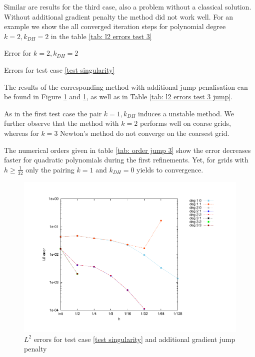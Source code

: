 Similar are results for the third case, also a problem without a classical solution. Without additional gradient penalty the method did not work well. For an example we show the all converged iteration steps for polynomial degree $k=2, k_{DH}=2$ in the table \ref{tab: l2 errors test 3}
\begin{table}[H]
		\centering
		\pgfplotstabletypeset[
		columns={iterations, l2error, h1error,N},
		    every row 0 column 0/.style={set content=init},
		]{\MAThreedegTwoTwo}
    	\caption{Error for $k=2, k_{DH}=2$}
	\caption{Errors for test case \ref{test singularity}}
	\label{tab: l2 errors test 3}
\end{table}

The results of the corresponding method with additional jump penalisation can be found in Figure \ref{fig: l2 errors test 3 jump} and \ref{fig: l2 errors test 3 jump}, as well as in Table \ref{tab: l2 errors test 3 jump}. 

As in the first test case the pair $k=1, k_{DH}$ induces a unstable method. We further observe that the method with $k=2$ performs well on coarse grids, whereas for $k=3$ Newton's method do not converge on the coarsest grid. 

The numerical orders given in table \ref{tab: order jump 3} show the error decreases faster for quadratic polynomials during the first refinements. Yet, for grids with $h \geq \frac 1 {32}$ only the pairing $k=1$ and $k_{DH} =0$ yields to convergence.

\begin{figure}[H]
	\centering
	\includegraphics[scale =0.45]{plots/MA3_Neilan_GradJump_l2.pdf}
	\caption{$L^2$ errors for test case \ref{test singularity} and additional gradient jump penalty}
	\label{fig: l2 errors test 3 jump}
\end{figure}

